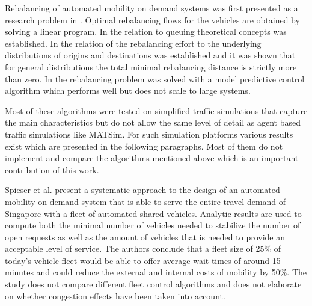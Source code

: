Rebalancing of automated mobility on demand systems was first presented as a research
 problem in \citep{pavone2011load}. Optimal rebalancing flows for the vehicles are
 obtained by solving a linear program. In \citep{zhang2016control} the relation to
 queuing theoretical concepts was established. In \citep{treleaven2011asymptotically}
 the relation of the rebalancing effort to the underlying distributions of origins
 and destinations was established and it was shown that for general distributions
 the total minimal rebalancing distance is strictly more than zero.
 In   \citep{zhang2016model} the rebalancing problem was solved with a model
 predictive control algorithm which performs well but does not scale to large systems.

Most of these algorithms were tested on simplified traffic simulations that capture
the main characteristics but do not allow the same level of detail as agent based
traffic simulations like MATSim. For such simulation platforms various results
exist which are presented in the following paragraphs. Most of them do not
implement and compare the algorithms mentioned above which is an important
contribution of this work.

Spieser et al. \cite{spieser2014toward} present a systematic approach to the
design of an automated mobility on demand system that is able to serve the entire
travel demand of Singapore with a fleet of automated shared vehicles. Analytic
results are used to compute both the minimal number of vehicles needed to stabilize
the number of open requests as well as the amount of vehicles that is needed to
provide an acceptable level of service. The authors conclude that a fleet size
of 25\% of today's vehicle fleet would be able to offer average wait times of
around 15 minutes and could reduce the external and internal costs of mobility by 50\%.
The study does not compare different fleet control algorithms and does not
elaborate on whether congestion effects have been taken into account.

